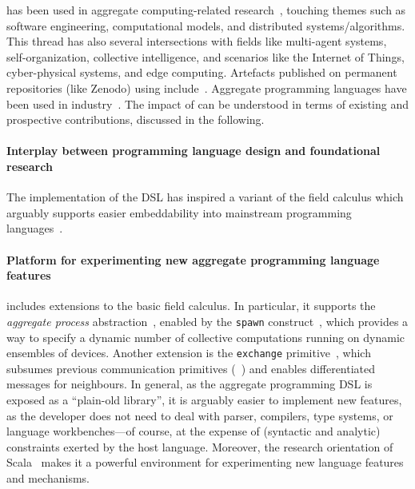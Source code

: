 \scafi{}
 has been used 
 in aggregate computing-related research~\cite{DBLP:journals/eaai/CasadeiVAPD21,audrito2022ecoop-xc,DBLP:conf/coordination/AguzziCV22,
 DBLP:conf/fmec/CasadeiV19,DBLP:conf/IEEEscc/CasadeiTVD19,DBLP:journals/scp/CasadeiAV18,DBLP:journals/jsan/CasadeiAV21,DBLP:conf/coordination/CasadeiVRA21,casadei2022applsci,arxiv2020scafi-nc},
  touching themes such as 
  software engineering, 
  computational models, and
  distributed systems/algorithms.
%
This thread
 has also several intersections
 with fields like
 multi-agent systems, 
 self-organization,
 collective intelligence,
 and scenarios like the Internet of Things, cyber-physical systems, and  edge computing. 
%
Artefacts published on permanent repositories (like Zenodo) using \scafi{} 
 include~\cite{zenodo-xc-scala,zenodo-smartc-scala,artifact-ieee-decentralised-systems}.
%
Aggregate programming languages 
 have been used in industry~\cite{DBLP:conf/saso/PaulosDBMHBPSSS19,DBLP:journals/taas/BealULRM18}.
%
The impact of \scafi{}
 can be understood in terms of 
 existing and prospective contributions, 
 discussed in the following.

\paragraph*{Interplay between programming language design and foundational research} 
%
The implementation of the \scafi{} DSL
 has inspired a variant of the field calculus
 which arguably supports easier embeddability
 into mainstream programming languages~\cite{DBLP:conf/isola/CasadeiVAD20,arxiv2020scafi-nc}.

\paragraph*{Platform for experimenting new aggregate programming language features}
%
\scafi{} includes extensions to the basic field calculus.
%
In particular, it supports the \emph{aggregate process} abstraction~\cite{DBLP:journals/eaai/CasadeiVAPD21}, enabled by the \texttt{spawn} construct~\cite{DBLP:conf/coordination/CasadeiVAPD19}, 
which provides a way to specify a dynamic number of collective computations running on dynamic ensembles of devices.
%
Another extension is the \texttt{exchange} primitive~\cite{audrito2022ecoop-xc,zenodo-xc-scala}, which subsumes previous communication primitives (~\cite{DBLP:journals/tocl/AudritoVDPB19}) and enables differentiated messages for neighbours.
%
In general, 
 as the aggregate programming DSL is exposed as a ``plain-old library'', it is arguably easier
 to implement new features,
 as the developer does not need to deal 
 with parser, compilers, type systems, or language workbenches---of course, at the expense of (syntactic and analytic) constraints exerted by the host language.
%
Moreover, the research orientation of Scala~\cite{Odersky04scala-overview} 
 makes it a powerful environment for experimenting new language features and mechanisms. 


